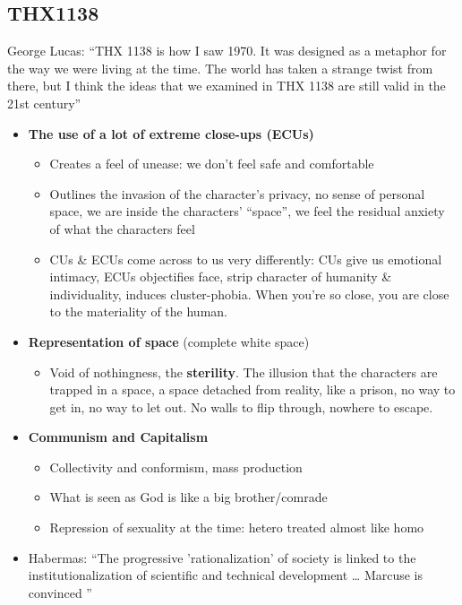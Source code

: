 \documentclass[11pt,fleqn]{book} %
\begin{document}
\subsection{THX1138}
George Lucas: \enquote{THX 1138 is how I saw 1970. It was
designed as a metaphor for the
way we were living at the time. The
world has taken a strange twist
from there, but I think the ideas
that we examined in THX 1138 are
still valid in the 21st century}
\begin{itemize}
    \item \textbf{The use of a lot of extreme close-ups (ECUs)}
    \begin{itemize}
        \item Creates a feel of unease: we don't feel safe and comfortable
        \item Outlines the invasion of the character's privacy, no sense of personal space, we are inside the characters' \enquote{space}, we feel the residual anxiety of what the characters feel
        \item CUs \& ECUs come across to us very differently: CUs give us emotional intimacy, ECUs objectifies face, strip character of humanity \& individuality, induces cluster-phobia. When you're so close, you are close to the materiality of the human.
    \end{itemize}
    \item \textbf{Representation of space} (complete white space)
    \begin{itemize}
        \item Void of nothingness, the \textbf{sterility}. The illusion that the characters are trapped in a space, a space detached from reality, like a prison, no way to get in, no way to let out. No walls to flip through, nowhere to escape. 
    \end{itemize}
    \item \textbf{Communism and Capitalism}
    \begin{itemize}
        \item Collectivity and conformism, mass production
        \item What is seen as God is like a big brother/comrade
        \item Repression of sexuality at the time: hetero treated almost like homo
    \end{itemize}
    \item Habermas: \enquote{The progressive 'rationalization' of society is
linked to the institutionalization of scientific and
technical development … Marcuse is convinced
}
\end{itemize}
\end{document}
